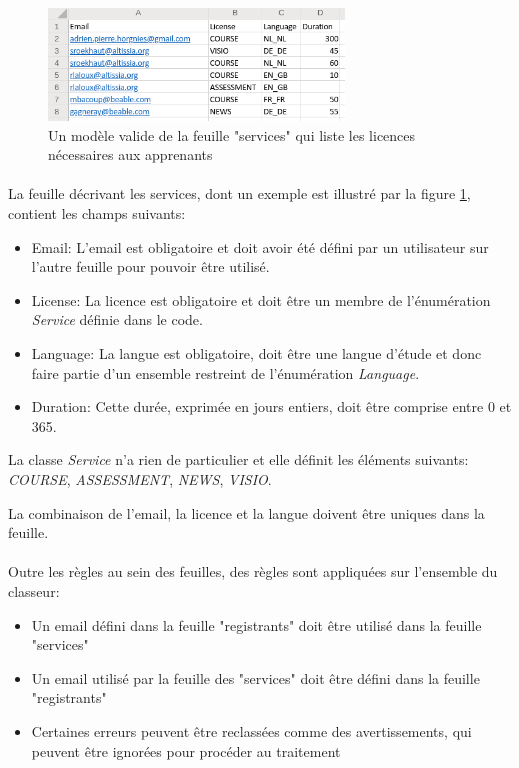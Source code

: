 \begin{figure}[ht]
    \centering
    \includegraphics[width=0.7\textwidth]{images/screenshot/sheet-services.png}
    \caption{Un modèle valide de la feuille "services" qui liste les licences nécessaires aux apprenants}
    \label{fig:sheet-services}
\end{figure}

\paragraph{}
La feuille décrivant les services, dont un exemple est illustré par la figure \ref{fig:sheet-services}, contient les champs suivants:
\begin{itemize}
    \item Email: L'email est obligatoire et doit avoir été défini par un utilisateur sur l'autre feuille pour pouvoir être utilisé.
    \item License: La licence est obligatoire et doit être un membre de l'énumération \textit{Service} définie dans le code.
    \item Language: La langue est obligatoire, doit être une langue d'étude et donc faire partie d'un ensemble restreint de l'énumération \textit{Language}.
    \item Duration: Cette durée, exprimée en jours entiers, doit être comprise entre 0 et 365.
\end{itemize}
La classe \textit{Service} n'a rien de particulier et elle définit les éléments suivants: \textit{COURSE}, \textit{ASSESSMENT}, \textit{NEWS}, \textit{VISIO}.

La combinaison de l'email, la licence et la langue doivent être uniques dans la feuille.

\paragraph{}
Outre les règles au sein des feuilles, des règles sont appliquées sur l'ensemble du classeur:
\begin{itemize}
    \item Un email défini dans la feuille "registrants" doit être utilisé dans la feuille "services"
    \item Un email utilisé par la feuille des "services" doit être défini dans la feuille "registrants"
    \item Certaines erreurs peuvent être reclassées comme des avertissements, qui peuvent être ignorées pour procéder au traitement
\end{itemize}

